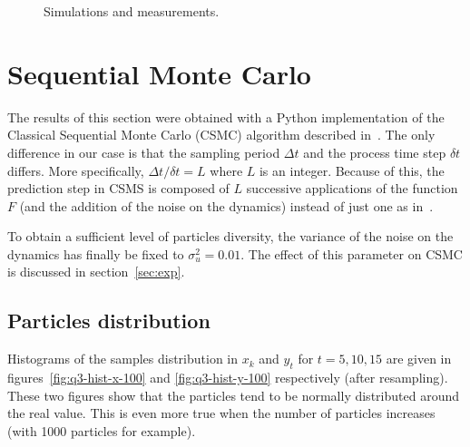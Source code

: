 \documentclass[english, DIV=13]{scrartcl}
\begin{document}
\begin{figure}[hb]
    \caption{Simulations and measurements.}
\end{figure}

\FloatBarrier

\section{Sequential Monte Carlo}
The results of this section were obtained with a Python implementation of the Classical
Sequential Monte Carlo (CSMC) algorithm described in~\cite{anuj}. The only difference
in our case is that the sampling period $\Delta t$ and the process time step $\delta t$
differs. More specifically, $\Delta t/\delta t = L$ where $L$ is an integer. Because
of this, the prediction step in CSMS is composed of $L$ successive applications of the
function $F$ (and the addition of the noise on the dynamics) instead of just one as
in~\cite{anuj}.

To obtain a sufficient level of particles diversity, the variance of the noise on the
dynamics has finally be fixed to $\sigma^2_u = 0.01$. The effect of this parameter on
CSMC is discussed in section~\ref{sec:exp}.

\subsection{Particles distribution}
\label{sec:particles-distri}
Histograms of the samples distribution in $x_k$ and $y_t$ for $t = 5, 10, 15$ are
given in figures~\ref{fig:q3-hist-x-100} and \ref{fig:q3-hist-y-100} respectively
(after resampling). These two figures show that the particles tend to be normally
distributed around the real value. This is even more true when the number of particles
increases (with 1000 particles for example).
\end{document}
